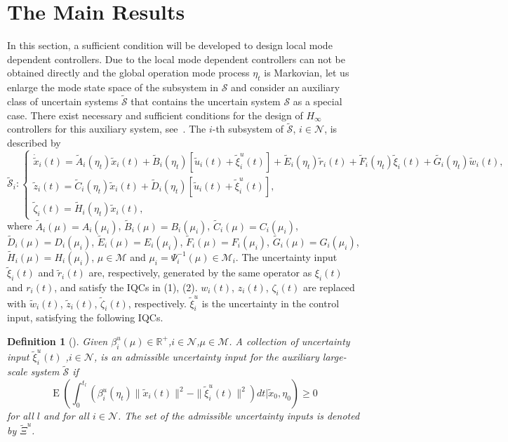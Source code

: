 \documentclass[11pt,draftcls,onecolumn]{IEEEtran}
\DeclareMathOperator{\E}{E}
\newtheorem{definition}{Definition}
\begin{document}
\section{The Main Results}
In this section,  a sufficient condition will be developed to design  local mode dependent controllers. Due to the local mode dependent controllers can not be obtained directly and the global operation mode process $\eta_t$ is Markovian, let us enlarge the mode state space of the subsystem in $\mathcal{S}$ and   consider an auxiliary class of uncertain systems $\tilde{\mathcal{S}}$  that contains the uncertain system $\mathcal{S}$ as a special case. There exist  necessary and sufficient conditions for the design of $H_\infty$ controllers for this auxiliary  system, see~\cite{Zhang2008,Marcos2008}.
The $i$-th subsystem of $\tilde{\mathcal{S}}$, $i \in \mathcal{N} $, is described by
\begin{equation*}
\label{auxiliary global mode system}
\tilde{\mathcal{S}}_i:\left\{
\begin{array}{l} \dot{\tilde{x}}_i(t)=\tilde{A}_i(\eta_t)\tilde{x}_i(t)+\tilde{B}_i(\eta_t)\left[\tilde{u}_i(t)+\tilde{\xi}^u_i(t)\right]+\tilde{E}_i(\eta_t)\tilde{r}_i(t)
  +\tilde{F}_i(\eta_t)\tilde{\xi}_i(t)+\tilde{G_i}(\eta_t)\tilde{w}_i(t),\\
 \tilde{z}_i(t)=\tilde{C}_i(\eta_t)\tilde{x}_i(t)+\tilde{D}_i(\eta_t)\left[\tilde{u}_i(t)+\tilde{\xi}^u_i(t)\right],\\
 \tilde{\zeta}_i(t)=\tilde{H}_i(\eta_t)\tilde{x}_i(t),
\end{array}
\right.
\end{equation*}
where $\tilde{A}_i(\mu)=A_i(\mu_i)$,  $\tilde{B}_i(\mu)=B_i(\mu_i)$, $\tilde{C}_i(\mu)=C_i(\mu_i)$, $\tilde{D}_i(\mu)=D_i(\mu_i)$, $\tilde{E}_i(\mu)=E_i(\mu_i)$, $\tilde{F}_i(\mu)=F_i(\mu_i)$, $\tilde{G}_i(\mu)=G_i(\mu_i)$, $\tilde{H}_i(\mu)=H_i(\mu_i)$, $\mu\in \mathcal{M}$ and $ \mu_i=\Psi_i^{-1}(\mu)\in\mathcal{M}_i$. The uncertainty input $\tilde{\xi}_i(t)$ and $\tilde{r}_i(t)$ are, respectively, generated by the same operator as $\xi_i(t)$ and $r_i(t)$, and satisfy the IQCs in (1), (2). $w_i(t)$, $z_i(t)$, $\zeta_i(t)$ are replaced with $\tilde{w}_i(t)$, $\tilde{z}_i(t)$, $\tilde{\zeta}_i(t)$, respectively.  $\tilde{\xi}_i^u$ is the uncertainty in the control input, satisfying the following IQCs.
\begin{definition} [\cite{Xiong2009}]
Given $\beta_i^u(\mu)\in \mathbb{R}^{+}$,$ i \in \mathcal{N}$,$ \mu \in \mathcal{M}$. A collection of uncertainty input $\tilde{\xi}_i^u(t)$ ,$ i \in \mathcal{N}$, is an admissible uncertainty input for the auxiliary large-scale system  $\tilde{\mathcal{S}}$ if
\label{definition for uncertainty in global system}
\begin{equation}
\E\left(\int_0^{t_l}\left(\beta_i^u(\eta_t)\|\tilde{x}_i(t)\|^2-\|\tilde{\xi}_i^u(t)\|^2\right)dt|\tilde{x}_0,\eta_0\right)\geq 0
\end{equation}
for all $ l$ and for all $ i \in \mathcal{N}$. The set of the admissible uncertainty inputs is denoted by $\tilde{\Xi}^{u}$.
\end{definition}
\end{document}
